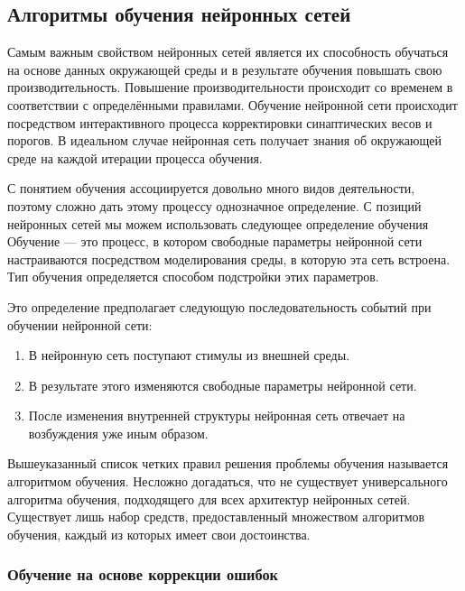 \subsection{Алгоритмы обучения нейронных сетей}

Самым важным свойством нейронных сетей является их способность обучаться на основе данных окружающей среды и в  результате обучения повышать свою производительность.
Повышение производительности происходит со временем в соответствии с определёнными правилами.
Обучение нейронной сети происходит посредством интерактивного
процесса корректировки синаптических весов и порогов.
В идеальном случае нейронная сеть получает знания об окружающей среде на каждой итерации процесса обучения.

С понятием обучения ассоциируется довольно много видов деятельности, поэтому сложно дать этому процессу однозначное определение.
С позиций нейронных сетей мы можем использовать следующее определение обучения
Обучение ---  это процесс, в котором свободные параметры нейронной сети настраиваются посредством моделирования среды, в которую эта сеть встроена.
Тип обучения определяется способом подстройки этих параметров. 

Это определение предполагает следующую последовательность событий при обучении нейронной сети:

\begin{enumerate}
	\item В нейронную сеть поступают стимулы из внешней среды.

	\item В результате этого изменяются свободные параметры нейронной сети.

	\item После изменения внутренней структуры нейронная сеть отвечает на возбуждения уже иным образом.
\end{enumerate}

Вышеуказанный список четких правил решения проблемы обучения называется алгоритмом обучения. 
Несложно догадаться, что не существует универсального алгоритма обучения, подходящего для всех архитектур нейронных сетей.
Существует лишь набор средств, предоставленный множеством алгоритмов обучения, каждый из которых имеет свои достоинства.\cite{NejronnyeSeti}

\subsubsection{Обучение на основе коррекции ошибок}

